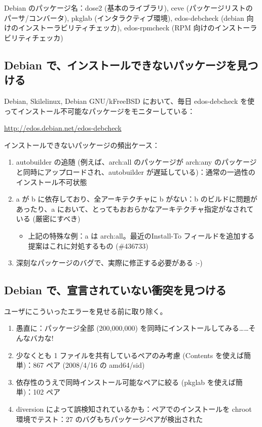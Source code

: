 \documentclass[mingoth,a4paper]{jsarticle}
\begin{document}
\begin{commandline}
Debian のパッケージ名：dose2 (基本のライブラリ), ceve (パッケージリストのパーサ/コンバータ), pkglab (インタラクティブ環境), edos-debcheck (debian 向けのインストーラビリティチェッカ), edos-rpmcheck (RPM 向けのインストーラビリティチェッカ)


\subsection{Debian で、インストールできないパッケージを見つける}

Debian, Skilelinux, Debian GNU/kFreeBSD において、毎日 edos-debcheck を使ってインストール不可能なパッケージをモニターしている：

\url{http://edos.debian.net/edos-debcheck}

インストールできないパッケージの頻出ケース：

\begin{enumerate}
\item autobuilder の追随 (例えば、arch:all のパッケージが arch:any のパッケージと同時にアップロードされ、autobuilder が遅延している)：通常の一過性のインストール不可状態
\item a が b に依存しており、全アーキテクチャに b がない：b のビルドに問題があったり、a において、とってもおおらかなアーキテクチャ指定がなされている (厳密にすべき)

\begin{itemize}
\item 上記の特殊な例：a は arch:all。最近のInstall-To フィールドを追加する提案はこれに対処するもの (\#436733)
\end{itemize}
\item 深刻なパッケージのバグで、実際に修正する必要がある :-)
\end{enumerate}


\subsection{Debian で、宣言されていない衝突を見つける}

ユーザにこういったエラーを見せる前に取り除く。

\begin{enumerate}
\item 愚直に：パッケージ全部 (200,000,000) を同時にインストールしてみる……そんなバカな!
\item 少なくとも 1 ファイルを共有しているペアのみ考慮 (Contents を使えば簡単)：867 ペア (2008/4/16 の amd64/sid)
\item 依存性のうえで同時インストール可能なペアに絞る (pkglab を使えば簡単)：102 ペア
\item diversion によって誤検知されているかも：ペアでのインストールを chroot 環境でテスト：27 のバグもちパッケージペアが検出された
\end{enumerate}


\end{commandline}
\end{document}
